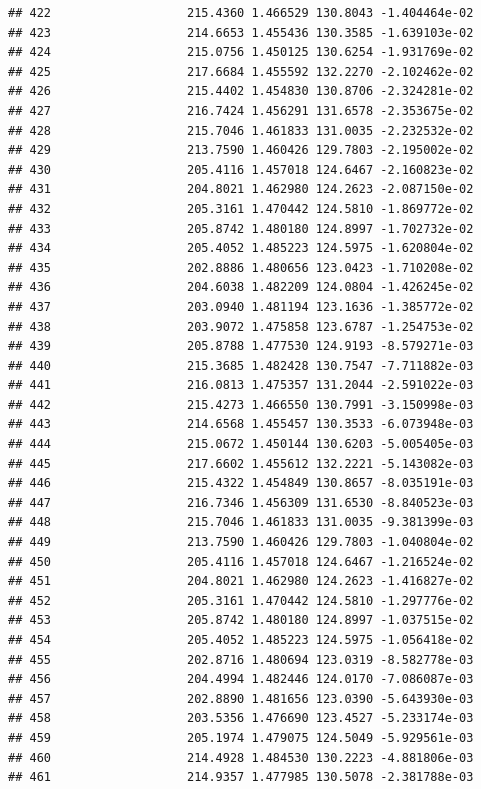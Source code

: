 \documentclass[
]{article}
\begin{document}
\begin{verbatim}
## 422                   215.4360 1.466529 130.8043 -1.404464e-02
## 423                   214.6653 1.455436 130.3585 -1.639103e-02
## 424                   215.0756 1.450125 130.6254 -1.931769e-02
## 425                   217.6684 1.455592 132.2270 -2.102462e-02
## 426                   215.4402 1.454830 130.8706 -2.324281e-02
## 427                   216.7424 1.456291 131.6578 -2.353675e-02
## 428                   215.7046 1.461833 131.0035 -2.232532e-02
## 429                   213.7590 1.460426 129.7803 -2.195002e-02
## 430                   205.4116 1.457018 124.6467 -2.160823e-02
## 431                   204.8021 1.462980 124.2623 -2.087150e-02
## 432                   205.3161 1.470442 124.5810 -1.869772e-02
## 433                   205.8742 1.480180 124.8997 -1.702732e-02
## 434                   205.4052 1.485223 124.5975 -1.620804e-02
## 435                   202.8886 1.480656 123.0423 -1.710208e-02
## 436                   204.6038 1.482209 124.0804 -1.426245e-02
## 437                   203.0940 1.481194 123.1636 -1.385772e-02
## 438                   203.9072 1.475858 123.6787 -1.254753e-02
## 439                   205.8788 1.477530 124.9193 -8.579271e-03
## 440                   215.3685 1.482428 130.7547 -7.711882e-03
## 441                   216.0813 1.475357 131.2044 -2.591022e-03
## 442                   215.4273 1.466550 130.7991 -3.150998e-03
## 443                   214.6568 1.455457 130.3533 -6.073948e-03
## 444                   215.0672 1.450144 130.6203 -5.005405e-03
## 445                   217.6602 1.455612 132.2221 -5.143082e-03
## 446                   215.4322 1.454849 130.8657 -8.035191e-03
## 447                   216.7346 1.456309 131.6530 -8.840523e-03
## 448                   215.7046 1.461833 131.0035 -9.381399e-03
## 449                   213.7590 1.460426 129.7803 -1.040804e-02
## 450                   205.4116 1.457018 124.6467 -1.216524e-02
## 451                   204.8021 1.462980 124.2623 -1.416827e-02
## 452                   205.3161 1.470442 124.5810 -1.297776e-02
## 453                   205.8742 1.480180 124.8997 -1.037515e-02
## 454                   205.4052 1.485223 124.5975 -1.056418e-02
## 455                   202.8716 1.480694 123.0319 -8.582778e-03
## 456                   204.4994 1.482446 124.0170 -7.086087e-03
## 457                   202.8890 1.481656 123.0390 -5.643930e-03
## 458                   203.5356 1.476690 123.4527 -5.233174e-03
## 459                   205.1974 1.479075 124.5049 -5.929561e-03
## 460                   214.4928 1.484530 130.2223 -4.881806e-03
## 461                   214.9357 1.477985 130.5078 -2.381788e-03

\end{verbatim}
\end{document}
